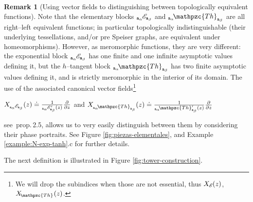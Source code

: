 \documentclass[final,3p,times]{elsarticle}
\newcommand{\del}[2]{\frac{\partial #1}{\partial #2}}
\newcommand{\ent}[2]{{}_{#1}\hspace{-1pt}\mathscr{E}_{#2}}
\newcommand{\htan}[2]{{}_{#1}\hspace{-2pt}\mathpzc{Th}_{#2}}    %
\theoremstyle{definition}
\newtheorem{remark}[theorem]{Remark}
\begin{document}
\begin{remark}[Using vector fields to distinguishing between topologically equivalent functions]
\label{rem:vec-fields-distinguish-elementary-blocks}
Note that the elementary blocks 
$\ent{{\tt a}_\alpha }{{\tt a}_\beta }$ and  
$\htan{{\tt a}_\alpha }{{\tt a}_\beta }$
are all
right--left equivalent functions;
in particular topologically indistinguishable
(their underlying tessellations, and/or pre Speiser graphs, 
are equivalent under homeomorphisms). 
However, as meromorphic functions, 
they are very different: the exponential block 
$\ent{{\tt a}_\alpha }{{\tt a}_\beta }$ has 
one finite and one infinite asymptotic values defining it, 
but the $h$--tangent block  $\htan{{\tt a}_\alpha }{{\tt a}_\beta }$ 
has two finite asymptotic values defining 
it, and is strictly meromorphic in the interior of its domain.
The use of the associated canonical 
vector fields\footnote{We will drop the subindices 
when those are not essential, 
thus $X_{\ent{}{}}(z)$, $X_{\htan{}{}}(z)$.
}

\centerline{
$X_{\ent{{\tt a}_\alpha }{{\tt a}_\beta }} (z) \doteq \frac{1}{ \ent{{\tt a}_\alpha }{{\tt a}_\beta } ^{\prime} (z) }
\del{}{z}$ 
\quad and \quad
$X_{\htan{{\tt a}_\alpha}{{\tt a}_\beta }  } (z) \doteq \frac{1}{ \htan{{\tt a}_\alpha }{{\tt a}_\beta } ^{\prime} (z) }
\del{}{z}$ }

\noindent
see \cite{AlvarezMucino3}\,prop.\,2.5,
allows us to very easily distinguish between them
by considering their phase portraits. 
See Figure \ref{fig:piezas-elementales}, and
Example \ref{example:N-exp-tanh}.c for further details.
\end{remark}

The next definition is illustrated in
Figure \ref{fig:tower-construction}.
\end{document}
